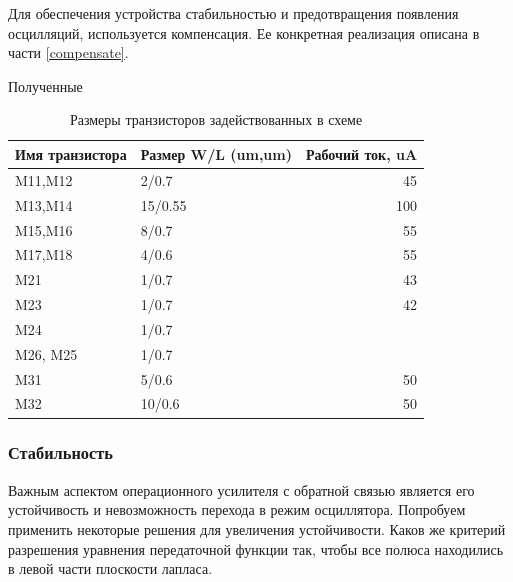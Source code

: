 \documentclass[a4paper,12pt]{article} %
\begin{document}
Для обеспечения устройства стабильностью и предотвращения появления осцилляций, используется компенсация. Ее конкретная реализация описана в части \ref{compensate}.


Полученные 


\begin{table}[]
    \centering
    \begin{tabular}{|l|l|r|}
    \hline
    Имя транзистора & Размер W/L (um,um) & \multicolumn{1}{l|}{Рабочий ток, uA} \\ \hline
    M11,M12         & 2/0.7              & 45                                   \\ \hline
    M13,M14         & 15/0.55            & 100                                  \\ \hline
    M15,M16         & 8/0.7              & 55                                   \\ \hline
    M17,M18         & 4/0.6              & 55                                   \\ \hline
    M21             & 1/0.7              & 43                                   \\ \hline
    M23             & 1/0.7              & 42                                   \\ \hline
    M24             & 1/0.7              & \multicolumn{1}{l|}{}                \\ \hline
    M26, M25        & 1/0.7              & \multicolumn{1}{l|}{}                \\ \hline
    M31             & 5/0.6              & 50                                   \\ \hline
    M32             & 10/0.6             & 50                                   \\ \hline
    \end{tabular}
    \caption{Размеры транзисторов задействованных в схеме}
    \label{tab:sizes}
    \end{table}



\subsubsection{Стабильность}

Важным аспектом операционного усилителя с обратной связью является его устойчивость и невозможность перехода в режим осциллятора. Попробуем применить некоторые решения для увеличения устойчивости. Каков же критерий разрешения уравнения передаточной функции так, чтобы все полюса находились в левой части плоскости лапласа.
\end{document}
